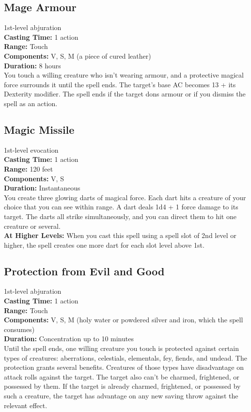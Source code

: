 \documentclass[11pt, A4paper, english]{article}
\begin{document}
		\subsection{Mage Armour}
1st-level abjuration \\
\textbf{Casting Time:} 1 action \\
\textbf{Range:} Touch \\
\textbf{Components:} V, S, M (a piece of cured leather) \\
\textbf{Duration:} 8 hours \\
You touch a willing creature who isn't wearing armour, and a protective magical force surrounds it until the spell ends. The target's base AC becomes 13 + its Dexterity modifier. The spell ends if the target dons armour or if you dismiss the spell as an action.

		\subsection{Magic Missile}
1st-level evocation \\
\textbf{Casting Time:} 1 action \\
\textbf{Range:} 120 feet \\
\textbf{Components:} V, S \\
\textbf{Duration:} Instantaneous \\
You create three glowing darts of magical force. Each dart hits a creature of your choice that you can see within range. A dart deals 1d4 + 1 force damage to its target. The darts all strike simultaneously, and you can direct them to hit one creature or several. \\
\textbf{At Higher Levels:} When you cast this spell using a spell slot of 2nd level or higher, the spell creates one more dart for each slot level above 1st.

		\subsection{Protection from Evil and Good}
1st-level abjuration \\
\textbf{Casting Time:} 1 action \\
\textbf{Range:} Touch \\
\textbf{Components:} V, S, M (holy water or powdered silver and iron, which the spell consumes) \\
\textbf{Duration:} Concentration up to  10 minutes \\
Until the spell ends, one willing creature you touch is protected against certain types of creatures: aberrations, celestials, elementals, fey, fiends, and undead. The protection grants several benefits. Creatures of those types have disadvantage on attack rolls against the target. The target also can't be charmed, frightened, or possessed by them. If the target is already charmed, frightened, or possessed by such a creature, the target has advantage on any new saving throw against the relevant effect.
\end{document}
